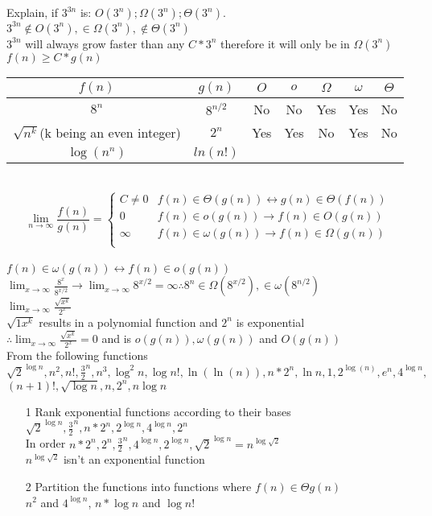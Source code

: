 \documentclass[12pt,largemargins]{homework}
\begin{document}
\question
Explain, if $3^{3 n}$ is: $ O ( 3^n ) ; \Omega ( 3^n ) ; \Theta ( 3^n ).$\\
$3^{3n} \notin O(3^n), \in \Omega(3^n), \notin \Theta(3^n)$\\
$3^{3n}$ will always grow faster than any $C * 3^n$ therefore it will only be in $\Omega(3^n)$ $f(n)\geq C*g(n)$\\
\question
\begin{tabular}{|c|c|c|c|c|c|c|}
\hline
$f(n)$&$g(n)$&$O$&$o$&$\Omega$&$\omega$&$\Theta$\\
\hline
$8^n$&$8^{n/2}$&No&No&Yes&Yes&No\\
\hline
$\sqrt{n^k} $(k being an even integer)$ $&$2^n$&Yes& Yes&No&Yes&No\\
\hline
$\log(n^n)$&$ln(n!)$\\
\hline
\end{tabular}\\
$$\lim_{n\to\infty}\frac{f(n)}{g(n)}=
\begin{cases} 
      C \neq 0 & f(n) \in \Theta(g(n)) \leftrightarrow g(n) \in \Theta(f(n))\\
      0 & f(n) \in o(g(n)) \rightarrow f(n) \in O(g(n))\\
      \infty & f(n) \in \omega(g(n)) \rightarrow f(n) \in \Omega(g(n))\\
   \end{cases}
\,$$\\
$f(n) \in \omega(g(n)) \leftrightarrow f(n) \in o(g(n))$\\
$\lim_{x\to\infty}\frac{8^x}{8^{x/2}}\rightarrow\lim_{x\to\infty}8^{x/2}=\infty\therefore 8^n \in \Omega (8^{x/2}), \in \omega(8^{n/2})$\\
$\lim_{x\to\infty} \frac{\sqrt{x^k}}{2^x}$\\
$\sqrt{1x^k}$ results in a polynomial function and $2^n$ is exponential\\
$\therefore \lim_{x\to\infty} \frac{\sqrt{x^k}}{2^x} = 0$ and is $o(g(n)), \omega (g(n))$ and $O(g(n))$\\
\question
From the following functions \\$ \sqrt{2}^{\log n},n^2,n!,\frac{3}{2}^n,n^3,\log^2 n, \log n!, \ln(\ln(n)), n*2^n, \ln n, 1,2^{\log(n)}, e^n, 4^{\log n},$ \\ $ (n+1)!, \sqrt{\log n}, n, 2^n,  n \log n$\\
\begin{itemize}
	\item[1] 
	Rank exponential functions according to their bases\\
	$  \sqrt{2}^{\log n}, \frac{3}{2}^n,  n*2^n,2^{\log n}, 4^{\log n}, 2^n$\\
	In order $ n*2^n, 2^n, \frac{3}{2}^n, 4^{\log n},2^{\log n},\sqrt{2}^{\log n}  = n^{\log \sqrt{2}}$\\
	$ n^{\log \sqrt{2}} $ isn't an exponential function\\
	\item[2]
	Partition the functions into functions where $ f(n)\in \Theta g(n) $\\
	$ n^2 $ and $ 4^{\log n} $, $ n* \log n $ and $ \log n! $
\end{itemize}
\end{document}
